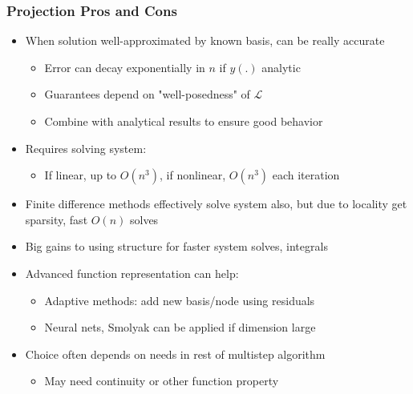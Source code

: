 \documentclass[bigger,handout]{beamer}
\begin{document}
\begin{frame}%
  
\frametitle{Projection Pros and Cons}

\begin{itemize}
\item When solution well-approximated by known basis, can be really accurate
\begin{itemize}
\item Error can decay exponentially in $n$ if $y(.)$ analytic
\item Guarantees depend on "well-posedness" of $\mathcal{L}$
\item Combine with analytical results to ensure good behavior
\end{itemize}
\item Requires solving system: 
\begin{itemize}
\item If linear, up to $O(n^3)$, if nonlinear, $O(n^3)$ each iteration 
\end{itemize}
\item Finite difference methods effectively solve system also, but due to locality get sparsity, fast $O(n)$ solves
\item Big gains to using structure for faster system solves, integrals
\item Advanced function representation can help:
\begin{itemize}
\item Adaptive methods: add new basis/node using residuals
\item Neural nets, Smolyak can be applied if dimension large
\end{itemize}
\item Choice often depends on needs in rest of multistep algorithm
\begin{itemize}
\item May need continuity or other function property
\end{itemize}



\end{itemize}

\end{frame}%
\end{document}
